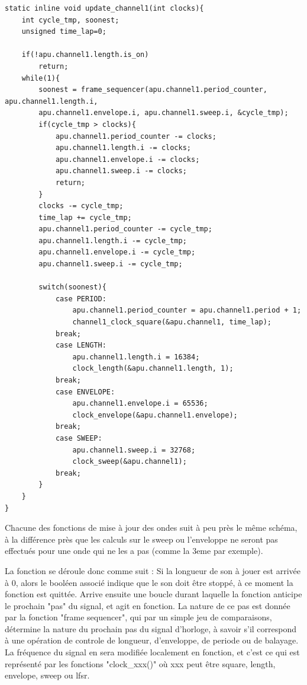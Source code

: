 \documentclass{report}
\begin{document}
\begin{lstlisting}
static inline void update_channel1(int clocks){
	int cycle_tmp, soonest;
	unsigned time_lap=0;

	if(!apu.channel1.length.is_on)
		return;
	while(1){
		soonest = frame_sequencer(apu.channel1.period_counter, apu.channel1.length.i,
		apu.channel1.envelope.i, apu.channel1.sweep.i, &cycle_tmp);
		if(cycle_tmp > clocks){
			apu.channel1.period_counter -= clocks;
			apu.channel1.length.i -= clocks;
			apu.channel1.envelope.i -= clocks;
			apu.channel1.sweep.i -= clocks;
			return;
		}
		clocks -= cycle_tmp;
		time_lap += cycle_tmp;
		apu.channel1.period_counter -= cycle_tmp;
		apu.channel1.length.i -= cycle_tmp;
		apu.channel1.envelope.i -= cycle_tmp;
		apu.channel1.sweep.i -= cycle_tmp;
		
		switch(soonest){
			case PERIOD:
				apu.channel1.period_counter = apu.channel1.period + 1;
				channel1_clock_square(&apu.channel1, time_lap);
			break;
			case LENGTH:
				apu.channel1.length.i = 16384;
				clock_length(&apu.channel1.length, 1);
			break;
			case ENVELOPE:
				apu.channel1.envelope.i = 65536;
				clock_envelope(&apu.channel1.envelope);
			break;
			case SWEEP:
				apu.channel1.sweep.i = 32768;
				clock_sweep(&apu.channel1);
			break;
		}
	}
}
\end{lstlisting}

Chacune des fonctions de mise à jour des ondes suit à peu près le même schéma, à la différence près que les calculs sur le sweep ou l'enveloppe ne seront 
pas effectués pour une onde qui ne les a pas (comme la 3eme par exemple).

La fonction se déroule donc comme suit :
Si la longueur de son à jouer est arrivée à 0, alors le booléen associé indique que le son doit être stoppé, à ce moment la fonction est quittée.
Arrive ensuite une boucle durant laquelle la fonction anticipe le prochain "pas" du signal, et agit en fonction.
La nature de ce pas est donnée par la fonction "frame sequencer", qui par un simple jeu de comparaisons, détermine la nature du prochain pas du signal d'horloge, 
à savoir s'il correspond à une opération de controle de longueur, d'enveloppe, de periode ou de balayage.
La fréquence du signal en sera modifiée localement en fonction, et c'est ce qui est représenté par les fonctions "clock\_xxx()" où xxx peut être square, length, envelope, sweep ou lfsr.
\end{document}

